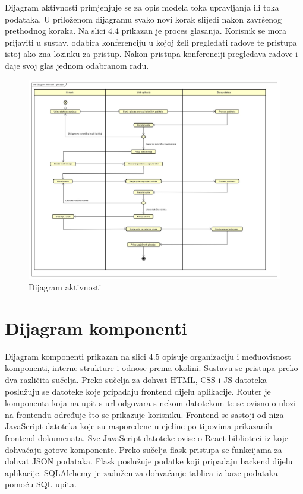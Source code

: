 			
			 \textit{}Dijagram aktivnosti primjenjuje se za opis modela toka upravljanja ili toka podataka. U priloženom dijagramu svako novi korak slijedi nakon završenog prethodnog koraka. Na slici 4.4 prikazan je proces glasanja. Korisnik se mora prijaviti u sustav, odabira konferenciju u kojoj želi pregledati radove te pristupa istoj ako zna lozinku za pristup. Nakon pristupa konferenciji pregledava radove i daje svoj glas jednom odabranom radu.
			 
			 \begin{figure}[htb]
			 	\centering
			 	\includegraphics[width=15cm]{slike/Dija_aktivnosti_glasanja.jpg}
			 	\caption{Dijagram aktivnosti}
			 	\label{fig:fer-logo}
			 \end{figure}
			
			\eject
		\section{Dijagram komponenti}
		

		
			 \textit{}Dijagram komponenti prikazan na slici 4.5 opisuje organizaciju i međuovisnost komponenti, interne strukture i odnose prema okolini. Sustavu se pristupa preko dva različita sučelja. Preko sučelja za dohvat HTML, CSS i JS datoteka poslužuju se datoteke koje pripadaju frontend dijelu aplikacije. Router je komponenta koja na upit s url odgovara s nekom datotekom te se ovisno o ulozi na frontendu određuje što se prikazuje korisniku. Frontend se sastoji od niza JavaScript datoteka koje su raspoređene u cjeline po tipovima prikazanih frontend dokumenata. Sve JavaScript datoteke ovise o React biblioteci iz koje dohvaćaju gotove komponente. Preko sučelja flask pristupa se funkcijama za dohvat JSON podataka. Flask poslužuje podatke koji pripadaju backend dijelu aplikacije. SQLAlchemy je zadužen za dohvaćanje tablica iz baze podataka pomoću SQL upita.
			 
